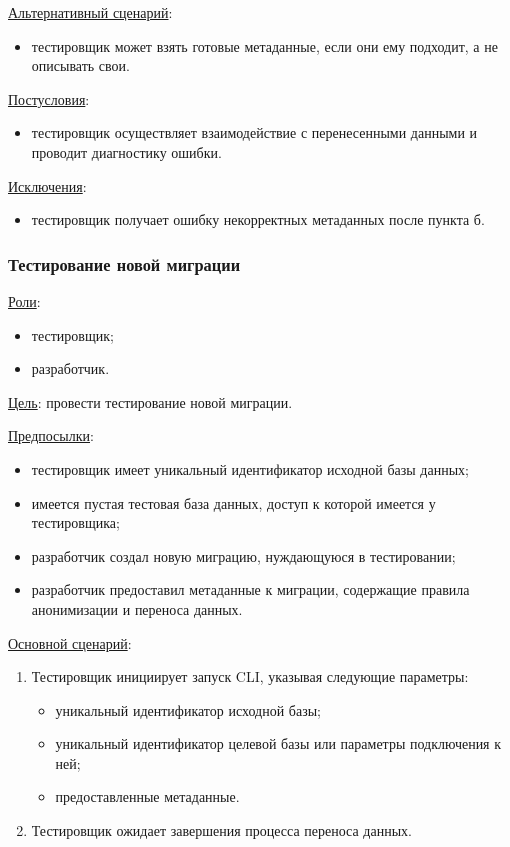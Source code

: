 \underline{Альтернативный сценарий}:

\begin{itemize}
    \item тестировщик может взять готовые метаданные, если они ему подходит, а не описывать свои.
\end{itemize}

\underline{Постусловия}:

\begin{itemize}
    \item тестировщик осуществляет взаимодействие с перенесенными данными и проводит диагностику ошибки.
\end{itemize}

\underline{Исключения}:

\begin{itemize}
    \item тестировщик получает ошибку некорректных метаданных после пункта б.
\end{itemize}


\subsubsection{Тестирование новой миграции}

\underline{Роли}:

\begin{itemize}
    \item тестировщик;
    \item разработчик.
\end{itemize}

\underline{Цель}: провести тестирование новой миграции.

\underline{Предпосылки}:

\begin{itemize}
    \item тестировщик имеет уникальный идентификатор исходной базы данных;
    \item имеется пустая тестовая база данных, доступ к которой имеется у тестировщика;
    \item разработчик создал новую миграцию, нуждающуюся в тестировании;
    \item разработчик предоставил метаданные к миграции, содержащие правила анонимизации и переноса данных.
\end{itemize}

\underline{Основной сценарий}:

\begin{enumerate}
    \item Тестировщик инициирует запуск CLI, указывая следующие параметры:
    \begin{itemize}
        \item уникальный идентификатор исходной базы;
        \item уникальный идентификатор целевой базы или параметры подключения к ней;
        \item предоставленные метаданные.
    \end{itemize}
    \item Тестировщик ожидает завершения процесса переноса данных.
\end{enumerate}

